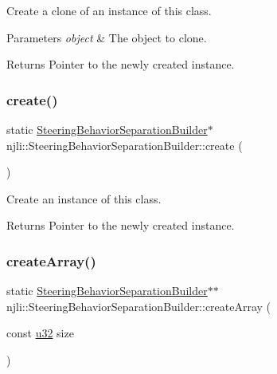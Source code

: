 Create a clone of an instance of this class.


\begin{DoxyParams}{Parameters}
{\em object} & The object to clone.\\
\hline
\end{DoxyParams}
\begin{DoxyReturn}{Returns}
Pointer to the newly created instance. 
\end{DoxyReturn}
\mbox{\label{classnjli_1_1_steering_behavior_separation_builder_a4152138e4606ac9a637c931a3847cf0e}} 
\subsubsection{\texorpdfstring{create()}{create()}}
{\footnotesize\ttfamily static \mbox{\hyperlink{classnjli_1_1_steering_behavior_separation_builder}{Steering\+Behavior\+Separation\+Builder}}$\ast$ njli\+::\+Steering\+Behavior\+Separation\+Builder\+::create (\begin{DoxyParamCaption}{ }\end{DoxyParamCaption})\hspace{0.3cm}{\ttfamily [static]}}

Create an instance of this class.

\begin{DoxyReturn}{Returns}
Pointer to the newly created instance. 
\end{DoxyReturn}
\mbox{\label{classnjli_1_1_steering_behavior_separation_builder_aa14d337599a98b074a65c021acea4b18}} 
\subsubsection{\texorpdfstring{create\+Array()}{createArray()}}
{\footnotesize\ttfamily static \mbox{\hyperlink{classnjli_1_1_steering_behavior_separation_builder}{Steering\+Behavior\+Separation\+Builder}}$\ast$$\ast$ njli\+::\+Steering\+Behavior\+Separation\+Builder\+::create\+Array (\begin{DoxyParamCaption}\item[{const \mbox{\hyperlink{_util_8h_a10e94b422ef0c20dcdec20d31a1f5049}{u32}}}]{size }\end{DoxyParamCaption})\hspace{0.3cm}{\ttfamily [static]}}

